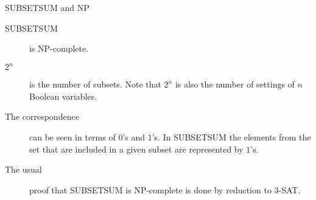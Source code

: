 \begin{frame}{SUBSETSUM and NP}
  \begin{description}
    \item[SUBSETSUM] is NP-complete.
    \item[$2^n$] is the number of subsets. Note that $2^n$ is also the number of settings of $n$ Boolean variables.
    \item[The correspondence] can be seen in terms of $0$'s and $1$'s. In SUBSETSUM the elements from the set that are included in a given subset are represented by $1$'s.
    \item[The usual] proof that SUBSETSUM is NP-complete is done by reduction to 3-SAT.
  \end{description}
\end{frame}